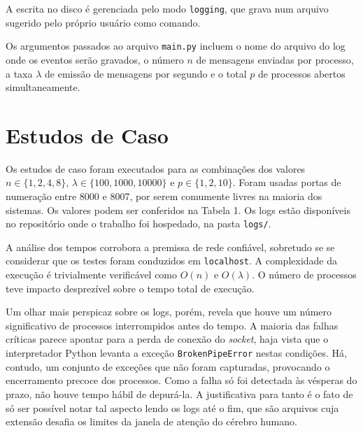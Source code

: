 \documentclass[a4paper,12pt]{article}
\begin{document}
        A escrita no disco é gerenciada pelo modo \texttt{logging}, que grava num arquivo sugerido pelo próprio usuário como comando.

        Os argumentos passados ao arquivo \texttt{main.py} incluem o nome do arquivo do log onde os eventos serão gravados, o número $n$ de mensagens enviadas por processo, a taxa $\lambda$ de emissão de mensagens por segundo e o total $p$ de processos abertos simultaneamente.

            
        
        \section{Estudos de Caso}
        
        Os estudos de caso foram executados para as combinações dos valores $n \in \{1, 2, 4, 8\}$, $\lambda \in \{100, 1000, 10000\}$ e $p \in \{1, 2, 10\}$.
        Foram usadas portas de numeração entre 8000 e 8007, por serem comumente livres na maioria dos sistemas.
        Os valores podem ser conferidos na Tabela 1.
        Os logs estão disponíveis no repositório onde o trabalho foi hospedado, na pasta \texttt{logs/}.

        A análise dos tempos corrobora a premissa de rede confiável, sobretudo se se considerar que os testes foram conduzidos em \texttt{localhost}.
        A complexidade da execução é trivialmente verificável como $O(n)$ e $O(\lambda)$.
        O número de processos teve impacto desprezível sobre o tempo total de execução.

        Um olhar mais perspicaz sobre os logs, porém, revela que houve um número significativo de processos interrompidos antes do tempo.
        A maioria das falhas críticas parece apontar para a perda de conexão do \emph{socket}, haja vista que o interpretador Python levanta a exceção \texttt{BrokenPipeError} nestas condições.
        Há, contudo, um conjunto de exceções que não foram capturadas, provocando o encerramento precoce dos processos.
        Como a falha só foi detectada às vésperas do prazo, não houve tempo hábil de depurá-la.
        A justificativa para tanto é o fato de só ser possível notar tal aspecto lendo os logs até o fim, que são arquivos cuja extensão desafia os limites da janela de atenção do cérebro humano.
\end{document}
